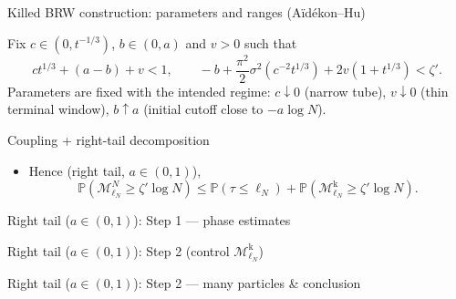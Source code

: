 \documentclass[10pt, aspectratio=169]{beamer}
\renewcommand{\P}{\mathbb{P}}
\begin{document}
\begin{frame}{Killed BRW construction: parameters and ranges (A\"id\'ekon--Hu)}
    \small
    \begin{center}
        \resizebox{!}{0.52\textheight}{}
    \end{center}
    \vspace{-1mm}
    \footnotesize
    Fix $c\in(0,t^{-1/3})$, $b\in(0,a)$ and $v>0$ such that
    \[
        ct^{1/3}+(a-b)+v<1,
        \qquad
        -b+\frac{\pi^2}{2}\sigma^2\!\left(c^{-2}t^{1/3}\right)+2v(1+t^{1/3})<\zeta'.
    \]
    \vspace{1mm}
    Parameters are fixed with the intended regime: $c\downarrow 0$ (narrow tube), $v\downarrow 0$ (thin terminal window), $b\uparrow a$ (initial cutoff close to $-a\log N$).
\end{frame}

\begin{frame}{Coupling + right-tail decomposition}
    \small
    
    \vspace{1mm}
    \begin{itemize}
        \item Hence (right tail, $a\in(0,1)$),
        \[
            \P\!\left(\mathcal M^N_{\ell_N}\ge \zeta'\log N\right)
            \le
            \P(\tau\le \ell_N)
            +
            \P\!\left(\mathcal M^{\mathrm k}_{\ell_N}\ge \zeta'\log N\right).
        \]
    \end{itemize}
    \vspace{1mm}
    
\end{frame}

\begin{frame}{Right tail ($a\in(0,1)$): Step 1 --- phase estimates}
    \small
    
\end{frame}

\begin{frame}{Right tail ($a\in(0,1)$): Step 2 (control $\mathcal M^{\mathrm k}_{\ell_N}$)}
    \small
    
\end{frame}

\begin{frame}{Right tail ($a\in(0,1)$): Step 2 --- many particles \& conclusion}
    \small
    
\end{frame}
\end{document}
